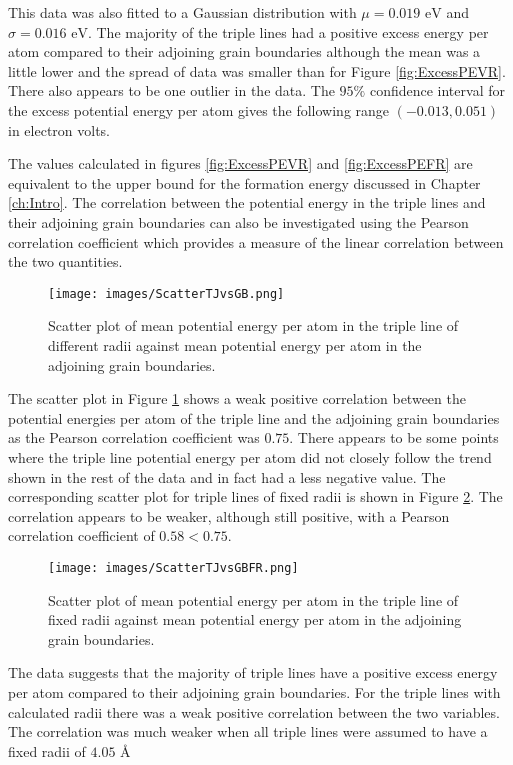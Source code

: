 \documentclass[12pt,a4paper,openany]{report}
\newcommand{\ts}[1]{\textrm{#1}}
\begin{document}
This data was also fitted to a Gaussian distribution with $\mu = 0.019 \ts{ eV} $ and $\sigma = 0.016 \ts{ eV}$. The majority of the triple lines had  a positive excess energy per atom compared to their adjoining grain boundaries although the mean was a little lower and the spread of data was smaller than for Figure \ref{fig:ExcessPEVR}. There also appears to be one outlier in the data. The $95\%$ confidence interval for the excess potential energy per atom gives the following range $(-0.013, 0.051)$ in electron volts.

The values calculated in figures \ref{fig:ExcessPEVR} and \ref{fig:ExcessPEFR} are equivalent to the upper bound for the formation energy discussed in Chapter \ref{ch:Intro}. The correlation between the potential energy in the triple lines and their adjoining grain boundaries can also be investigated using the Pearson correlation coefficient which provides a measure of the linear correlation between the two quantities.

\begin{figure}[H]
	\texttt{[image: images/ScatterTJvsGB.png]} 
	\caption{Scatter plot of mean potential energy per atom in the triple line of different radii against mean potential energy per atom in the adjoining grain boundaries.}
	\label{fig:ScatterTJvsGB}
\end{figure}

The scatter plot in Figure \ref{fig:ScatterTJvsGB} shows a weak positive correlation between the potential energies per atom of the triple line and the adjoining grain boundaries as the Pearson correlation coefficient was $0.75$. There appears to be some points where the triple line potential energy per atom did not closely follow the trend shown in the rest of the data and in fact had a less negative value. 
\newpage
The corresponding scatter plot for triple lines of fixed radii is shown in Figure \ref{fig:ScatterTJvsGBFR}. The correlation appears to be weaker, although still positive, with a Pearson correlation coefficient of $0.58 < 0.75$. 

\begin{figure}[H]
	\texttt{[image: images/ScatterTJvsGBFR.png]} 
	\caption{Scatter plot of mean potential energy per atom in the triple line of fixed radii against mean potential energy per atom in the adjoining grain boundaries.}
	\label{fig:ScatterTJvsGBFR}
\end{figure}

The data suggests that the majority of triple lines have a positive excess energy per atom compared to their adjoining grain boundaries. For the triple lines with calculated radii there was a weak positive correlation between the two variables. The correlation was much weaker when all triple lines were assumed to have a fixed radii of $4.05 \textrm{ \AA}$ 
\end{document}
